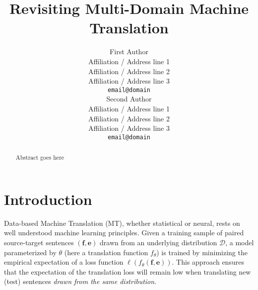 \documentclass[11pt]{article}
\title{Revisiting Multi-Domain Machine Translation}
\author{First Author \\
  Affiliation / Address line 1 \\
  Affiliation / Address line 2 \\
  Affiliation / Address line 3 \\
  {\tt email@domain} \\\And
  Second Author \\
  Affiliation / Address line 1 \\
  Affiliation / Address line 2 \\
  Affiliation / Address line 3 \\
  {\tt email@domain} \\}
\date{}
\newcommand{\jcDone}[1]{\done[JC]\Todo[JC:]{\textcolor{blue}{#1}}}
\newcommand{\src}{\ensuremath{\mathbf{f}}} %
\newcommand{\trg}{\ensuremath{\mathbf{e}}} %
\begin{document}
\maketitle
\begin{abstract}
Abstract goes here
\end{abstract}

\section{Introduction}
\label{intro}

%
% 

Data-based Machine Translation (MT), whether statistical or neural, rests on well understood machine learning principles. Given a training sample of paired source-target sentences $(\src,\trg)$\jcDone{shouldnt trg be e as below ?} drawn from an underlying distribution $\mathcal{D}$, a model parameterized by $\theta$ (here a translation function $f_{\theta}$) is trained by minimizing the empirical expectation of a loss function $\ell(f_\theta(\src, \trg))$. This approach ensures that the expectation of the translation loss will remain low when translating new (test) sentences \emph{drawn from the same distribution}.
\end{document}
